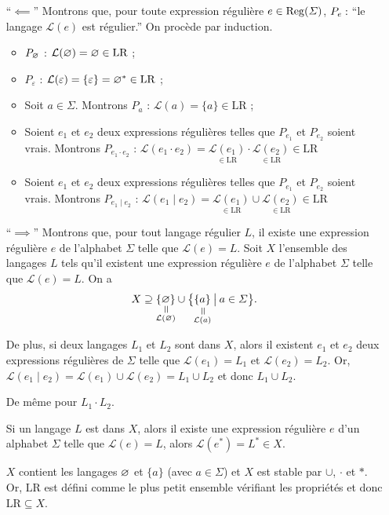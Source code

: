 \begin{prv}
	\begin{itemize}
		\item[``$\impliedby$\/'']
			Montrons que, pour toute expression régulière $e \in \operatorname{Reg}(\varSigma)$, $P_e : \hbox{}$\/``le langage $\mathcal{L}(e)$\/ est régulier.''
			On procède par induction.
			\begin{itemize}
				\item $P_{\varnothing}$\/ : $\mathcal{L}(\varnothing) = \varnothing \in \mathrm{LR}$\/ ;
				\item $P_{\varepsilon}$\/ : $\mathcal{L}(\varepsilon) = \{\varepsilon\} = \varnothing^* \in \mathrm{LR}$\/ ;
				\item Soit $a \in \Sigma$. Montrons $P_a$\/ : $\mathcal{L}(a) = \{a\} \in \mathrm{LR}$\/ ;
				\item Soient $e_1$\/ et $e_2$\/ deux expressions régulières telles que $P_{e_1}$\/ et $P_{e_2}$\/ soient vrais. Montrons $P_{e_1 \cdot e_2}$\/ : $\mathcal{L}(e_1 \cdot e_2) = \underset{\in \mathrm{LR}}{\mathcal{L}(e_1)} \cdot \underset{\in \mathrm{LR}}{\mathcal{L}(e_2)} \in \mathrm{LR}$\/
				\item Soient $e_1$\/ et $e_2$\/ deux expressions régulières telles que $P_{e_1}$\/ et $P_{e_2}$\/ soient vrais. Montrons $P_{e_1 \mid e_2}$\/ : $\mathcal{L}(e_1 \mid e_2) = \underset{\in \mathrm{LR}}{\mathcal{L}(e_1)} \cup \underset{\in \mathrm{LR}}{\mathcal{L}(e_2)} \in \mathrm{LR}$\/
			\end{itemize}
		\item[``$\implies$\/''] Montrons que, pour tout langage régulier $L$, il existe une expression régulière $e$\/ de l'alphabet $\Sigma$\/ telle que $\mathcal{L}(e) = L$. 
			Soit $X$\/ l'ensemble des langages $L$\/ tels qu'il existent une expression régulière $e$\/ de l'alphabet $\Sigma$\/ telle que $\mathcal{L}(e) = L$. On a \[
				X \supseteq \{ \underset{\mathclap{\substack{\vrt=\\\mathcal{L}(\O)}}}{\O} \} \cup \big\{ \underset{\mathclap{\substack{\vrt=\\\mathcal{L}(a)}}}{\{a\}} \:\big|\: a \in \Sigma \big\}
			.\]

			De plus, si deux langages $L_1$\/ et $L_2$\/ sont dans $X$, alors il existent $e_1$\/ et $e_2$\/ deux expressions régulières de $\Sigma$\/ telle que $\mathcal{L}(e_1) = L_1$\/ et $\mathcal{L}(e_2) = L_2$. Or, $\mathcal{L}(e_1  \mid e_2) = \mathcal{L}(e_1) \cup \mathcal{L}(e_2) = L_1 \cup L_2$\/ et donc $L_1 \cup L_2$.

			De même pour $L_1\cdot L_2$.

			Si un langage $L$\/ est dans $X$, alors il existe une expression régulière $e$\/ d'un alphabet $\Sigma$\/ telle que $\mathcal{L}(e) = L$, alors $\mathcal{L}(e^*) = L^* \in X$.
			
			$X$\/ contient les langages $\varnothing$\/ et $\{a\}$\/ (avec $a \in \Sigma$) et $X$\/ est stable par $\cup $, $\cdot $\/ et $*$. Or, $\mathrm{LR}$\/ est défini comme le plus petit ensemble vérifiant les propriétés et donc $\mathrm{LR} \subseteq X$.
	\end{itemize}
\end{prv}

